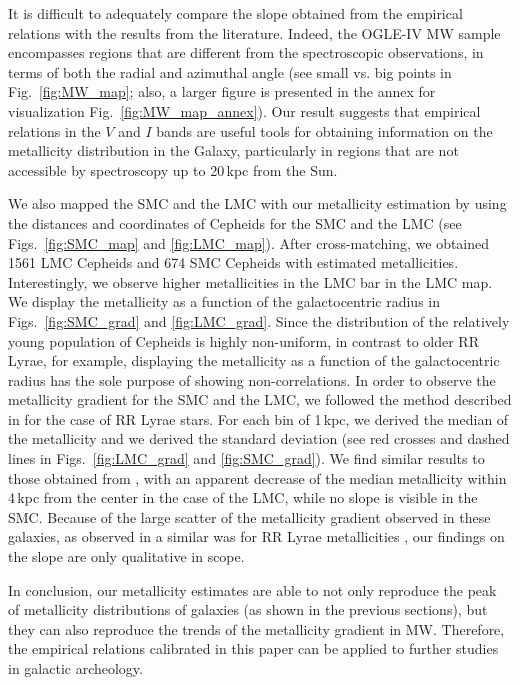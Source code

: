 \documentclass[article]{aa} %
\begin{document}
It is difficult to adequately compare the slope obtained from the empirical relations with the results from the literature. Indeed, the OGLE-IV MW sample encompasses regions that are different from the spectroscopic observations, in terms of both the radial and azimuthal angle (see small vs. big points in Fig.~\ref{fig:MW_map}; also, a larger figure is presented in the annex for visualization Fig.~\ref{fig:MW_map_annex}). Our result suggests that empirical relations in the $V$ and $I$ bands are useful tools for obtaining information on the metallicity distribution in the Galaxy, particularly in regions that are not accessible by spectroscopy up to 20$\,$kpc from the Sun.


We also mapped the SMC and the LMC with our metallicity estimation by using the distances and coordinates of Cepheids for the SMC and the LMC \citep{Jacyszyn2016} (see Figs.~\ref{fig:SMC_map} and \ref{fig:LMC_map}).  After cross-matching, we obtained 1561 LMC Cepheids and 674 SMC Cepheids with estimated metallicities. Interestingly, we observe higher metallicities in the LMC bar in the LMC map. We display the metallicity as a function of the galactocentric radius in Figs.~\ref{fig:SMC_grad} and \ref{fig:LMC_grad}. Since the distribution of the relatively young population of Cepheids is highly non-uniform, in contrast to older RR Lyrae, for example, displaying the metallicity as a function of the galactocentric radius has the sole purpose of showing non-correlations.
In order to observe the metallicity gradient for the SMC and the LMC, we followed the method described in \cite{Skowron2016} for the case of RR Lyrae stars. For each bin of 1$\,$kpc, we derived the median of the metallicity and we derived the standard deviation (see red crosses and dashed lines in Figs.~\ref{fig:LMC_grad} and \ref{fig:SMC_grad}). We find similar results to those obtained from \cite{Skowron2016}, with an apparent decrease of the median metallicity within 4$\,$kpc from the center in the case of the LMC, while no slope is visible in the SMC. Because of the large scatter of the metallicity gradient observed in these galaxies, as observed in a similar was for RR Lyrae metallicities \citep{Skowron2016}, our findings on the slope are only qualitative in scope.

In conclusion, our metallicity estimates are able to not only reproduce the peak of metallicity distributions of galaxies (as shown in the previous sections), but they can also reproduce the trends of the metallicity gradient in MW. Therefore, the empirical relations calibrated in this paper can be applied to further studies in galactic archeology.
\end{document}
